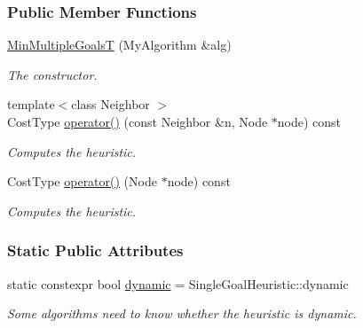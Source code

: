 \subsubsection*{Public Member Functions}
\begin{DoxyCompactItemize}
\item 
\hyperlink{structslb_1_1ext_1_1policy_1_1heuristic_1_1MinMultipleGoalsT_ae1f2259e9e9a4c393f294abca3810e05}{Min\+Multiple\+GoalsT} (My\+Algorithm \&alg)
\begin{DoxyCompactList}\small\item\em The constructor. \end{DoxyCompactList}\item 
{\footnotesize template$<$class Neighbor $>$ }\\Cost\+Type \hyperlink{structslb_1_1ext_1_1policy_1_1heuristic_1_1MinMultipleGoalsT_a5c2095cbab2f64cf53c653d994fd4d05}{operator()} (const Neighbor \&n, Node $\ast$node) const 
\begin{DoxyCompactList}\small\item\em Computes the heuristic. \end{DoxyCompactList}\item 
Cost\+Type \hyperlink{structslb_1_1ext_1_1policy_1_1heuristic_1_1MinMultipleGoalsT_a2850cb27c323600fe586acef9b2f3c76}{operator()} (Node $\ast$node) const 
\begin{DoxyCompactList}\small\item\em Computes the heuristic. \end{DoxyCompactList}\end{DoxyCompactItemize}
\subsubsection*{Static Public Attributes}
\begin{DoxyCompactItemize}
\item 
static constexpr bool \hyperlink{structslb_1_1ext_1_1policy_1_1heuristic_1_1MinMultipleGoalsT_ad3f36343ca408f5078ce1f238b75b02c}{dynamic} = Single\+Goal\+Heuristic\+::dynamic\hypertarget{structslb_1_1ext_1_1policy_1_1heuristic_1_1MinMultipleGoalsT_ad3f36343ca408f5078ce1f238b75b02c}{}\label{structslb_1_1ext_1_1policy_1_1heuristic_1_1MinMultipleGoalsT_ad3f36343ca408f5078ce1f238b75b02c}

\begin{DoxyCompactList}\small\item\em Some algorithms need to know whether the heuristic is dynamic. \end{DoxyCompactList}\end{DoxyCompactItemize}
